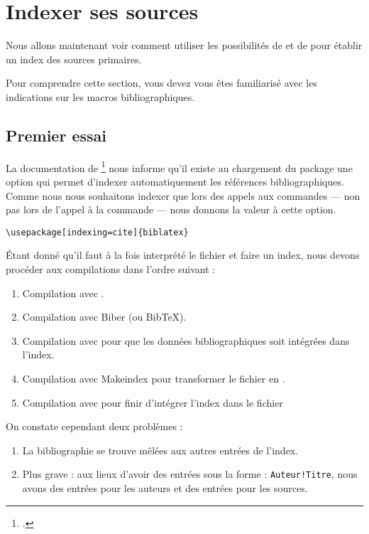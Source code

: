 \section{Indexer ses sources}


Nous allons maintenant voir comment utiliser les possibilités de  et de  pour établir un index des sources primaires.

Pour comprendre cette section, vous devez vous êtes familiarisé avec les indications sur les macros bibliographiques.



\subsection{Premier essai}

La documentation de \footcite{biblatex_options} nous informe qu'il existe  au chargement du package une option  qui permet d'indexer automatiquement les références bibliographiques. Comme nous nous souhaitons indexer que lors des appels aux commandes   ---  non pas lors de l'appel à la commande  --- nous donnons la valeur  à cette option. 

\begin{verbatim}
\usepackage[indexing=cite]{biblatex}
\end{verbatim}

Étant donné qu'il faut à la fois interprété le fichier  et faire un index, nous devons procéder aux compilations dans l'ordre suivant :

\begin{enumerate}
\item Compilation avec \XeLaTeX.
\item Compilation avec Biber (ou BibTeX).
\item Compilation avec \XeLaTeX pour que les données bibliographiques soit intégrées dans l'index.
\item Compilation avec Makeindex pour transformer le fichier  en .
\item Compilation avec \XeLaTeX pour finir d'intégrer l'index dans le fichier 
\end{enumerate}

On constate cependant deux problèmes : 
\begin{enumerate}
\item La bibliographie se trouve mêlées aux autres entrées de l'index.
\item Plus grave : aux lieux d'avoir des entrées sous la forme : \verb|Auteur!Titre|, nous avons des entrées pour les auteurs et des entrées pour les sources.
\end{enumerate}

